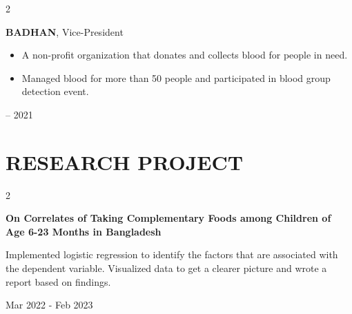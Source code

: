 \documentclass[10pt, letterpaper]{article}
\newenvironment{highlights}{
    \begin{itemize}[
        topsep=0.10 cm,
        parsep=0.10 cm,
        partopsep=0pt,
        itemsep=0pt,
        leftmargin=0.4 cm + 10pt
    ]
}{
    \end{itemize}
} %
\newenvironment{twocolentry}[2][]{
    \onecolentry
    \def\secondColumn{#2}
    \setcolumnwidth{\fill, 4.5 cm}
    \begin{paracol}{2}
}{
    \switchcolumn \raggedleft \secondColumn
    \end{paracol}
    \endonecolentry
} %
\begin{document}
         \vspace{0.2 cm}

        \begin{twocolentry}{
        2020 – 2021
        }
            \textbf{BADHAN}, Vice-President
            \begin{highlights}
                \item A non-profit organization that donates and collects blood for people in need.
                \item Managed blood for more than 50 people and participated in blood group detection event.
            \end{highlights}
        \end{twocolentry}



    

    
    \section{RESEARCH PROJECT}



        
        \begin{twocolentry}{
        Mar 2022 - Feb 2023
        }
            \textbf{On Correlates of Taking Complementary Foods among Children of Age 6-23 Months in Bangladesh}
            \begin{highlights}
                Implemented logistic regression to identify the factors that are associated with the dependent variable. Visualized data to get a clearer picture and wrote a report based on findings.
            \end{highlights}
        \end{twocolentry}






    
\end{document}
